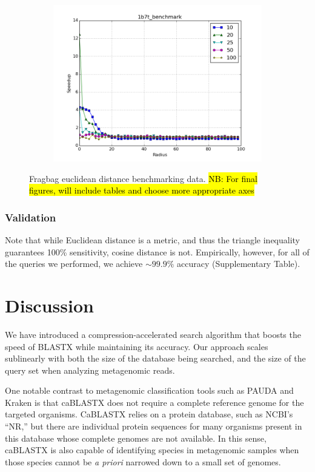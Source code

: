 \documentclass[review,preprint,12pt]{elsarticle}
\theoremstyle{definition}
\theoremstyle{remark}
\numberwithin{equation}{section}
\begin{document}
\begin{figure}[tbp]
\begin{subfigure}[b]{0.49\textwidth}
        \includegraphics[width=1\textwidth]{assets/1b7t_benchmark_euclid}
        \caption{}
    \end{subfigure}
    \caption{Fragbag euclidean distance benchmarking data. \hl{NB: For final figures, will include tables and choose more appropriate axes}}
    \label{fig:fragbag_euclid}
\end{figure}


\subsubsection*{Validation}
Note that while Euclidean distance is a metric, and thus the triangle inequality guarantees 100\% sensitivity, cosine distance is not.
Empirically, however, for all of the queries we performed, we achieve $\sim 99.9\%$ accuracy (Supplementary Table).

\section*{Discussion}

We have introduced a compression-accelerated search algorithm that boosts the
speed of BLASTX while maintaining its accuracy.
Our approach scales sublinearly with both the size of the database being
searched, and the size of the query set when analyzing metagenomic reads.

One notable contrast to metagenomic classification tools such as PAUDA and
Kraken is that caBLASTX does not require a complete reference genome for the
targeted organisms.
CaBLASTX relies on a protein database, such as NCBI's ``NR,'' but there are
individual protein sequences for many organisms present in this database whose
complete genomes are not available.
In this sense, caBLASTX is also capable of identifying species in metagenomic
samples when those species cannot be \emph{a priori} narrowed down to a small
set of genomes.
\end{document}
